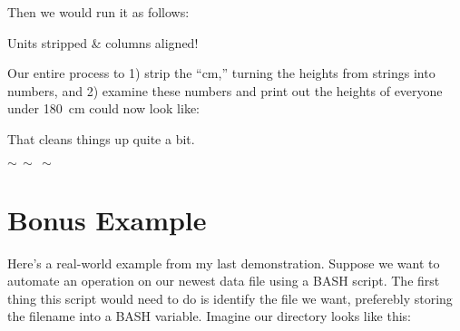 \documentclass[10pt,a4]{article}
\begin{document}
Then we would run it as follows:

\ttfamily
\colorbox{black}{}

\colorbox{black}{}
\normalfont

Units stripped \& columns aligned!

Our entire process to 1) strip the ``cm,'' turning the heights from strings into numbers, and 2) examine these numbers and print out the heights of everyone under 180~cm could now look like:

\ttfamily
\colorbox{black}{}
\normalfont

That cleans things up quite a bit.



\large
$\sim \, \sim \, \sim$
\normalsize


\pagebreak


\section*{Bonus Example}

Here's a real-world example from my last demonstration.
Suppose we want to automate an operation on our newest data file using a BASH script.
The first thing this script would need to do is identify the file we want, preferebly storing the filename into a BASH variable.
Imagine our directory looks like this:

\ttfamily
\colorbox{black}{}

\colorbox{black}{}
\normalfont
\end{document}
